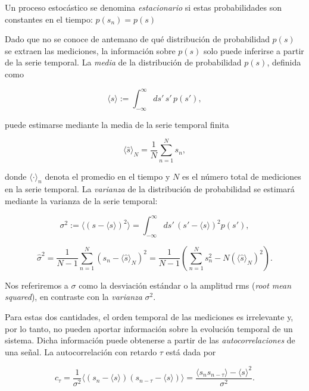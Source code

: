 \documentclass[10pt,a4paper]{book}
\begin{document}
Un proceso estocástico se denomina \emph{estacionario} si estas probabilidades son constantes en el tiempo: $p(s_n) = p(s)$

Dado que no se conoce de antemano de qué distribución de probabilidad $p(s)$ se extraen las mediciones, la información sobre $p(s)$ solo puede inferirse a partir de la serie temporal. La \emph{media} de la distribución de probabilidad $p(s)$, definida como

\begin{equation}
\langle s \rangle := \int_{-\infty}^{\infty} ds' \, s' \, p(s'), 
\end{equation}

puede estimarse mediante la media de la serie temporal finita

\begin{equation}
\langle \hat{s} \rangle_N = \frac{1}{N} \sum_{n=1}^N s_n ,
\end{equation}

donde $\langle \cdot \rangle_n$ denota el promedio en el tiempo y $N$ es el número total de mediciones en la serie temporal. La \emph{varianza} de la distribución de probabilidad se estimará mediante la varianza de la serie temporal:

\begin{equation}
\sigma^2 := \langle (s - \langle s \rangle)^2 \rangle = \int_{-\infty}^{\infty} ds' \, (s' - \langle s \rangle)^2 p(s'),
\end{equation}

\begin{equation}
\hat{\sigma}^2 = \frac{1}{N-1} \sum_{n=1}^N (s_n - \langle \hat{s} \rangle_N)^2 
= \frac{1}{N-1} \left( \sum_{n=1}^N s_n^2 - N (\langle \hat{s} \rangle_N)^2 \right).
\end{equation}

Nos referiremos a $\sigma$ como la desviación estándar o la amplitud rms (\emph{root mean squared}), en contraste con la \emph{varianza} $\sigma^2$.

Para estas dos cantidades, el orden temporal de las mediciones es irrelevante y, por lo tanto, no pueden aportar información sobre la evolución temporal de un sistema. Dicha información puede obtenerse a partir de las \emph{autocorrelaciones} de una señal. La autocorrelación con retardo $\tau$ está dada por

\begin{equation}
c_{\tau} = \frac{1}{\sigma^2} \langle (s_n - \langle s \rangle)(s_{n-\tau} - \langle s \rangle) \rangle 
= \frac{\langle s_n s_{n-\tau} \rangle - \langle s \rangle^2}{\sigma^2}.
\tag{2.5}
\end{equation}
\end{document}

